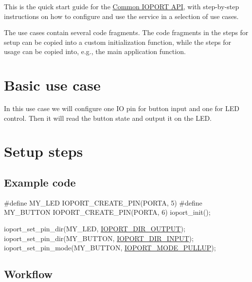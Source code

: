 This is the quick start guide for the \hyperlink{group__ioport__group}{Common I\-O\-P\-O\-R\-T A\-P\-I}, with step-\/by-\/step instructions on how to configure and use the service in a selection of use cases.

The use cases contain several code fragments. The code fragments in the steps for setup can be copied into a custom initialization function, while the steps for usage can be copied into, e.\-g., the main application function.\hypertarget{ioport_quickstart_ioport_quickstart_basic}{}\section{Basic use case}\label{ioport_quickstart_ioport_quickstart_basic}
In this use case we will configure one I\-O pin for button input and one for L\-E\-D control. Then it will read the button state and output it on the L\-E\-D.\hypertarget{ioport_quickstart_ioport_quickstart_basic_setup}{}\section{Setup steps}\label{ioport_quickstart_ioport_quickstart_basic_setup}
\hypertarget{ioport_quickstart_ioport_quickstart_basic_setup_code}{}\subsection{Example code}\label{ioport_quickstart_ioport_quickstart_basic_setup_code}

\begin{DoxyCode}
\textcolor{preprocessor}{         #define MY\_LED    IOPORT\_CREATE\_PIN(PORTA, 5)}
\textcolor{preprocessor}{}\textcolor{preprocessor}{         #define MY\_BUTTON IOPORT\_CREATE\_PIN(PORTA, 6)}
\textcolor{preprocessor}{}
         ioport\_init();

         ioport\_set\_pin\_dir(MY\_LED, \hyperlink{group__ioport__group_gga9c267f89800e58bd9dfd74e662a4a4c1a06de24313dad0169f3a366c62a84f4cc}{IOPORT\_DIR\_OUTPUT});
         ioport\_set\_pin\_dir(MY\_BUTTON, \hyperlink{group__ioport__group_gga9c267f89800e58bd9dfd74e662a4a4c1af854a0dce084e5a8e8744f9a502e7b7b}{IOPORT\_DIR\_INPUT});
         ioport\_set\_pin\_mode(MY\_BUTTON, \hyperlink{group__ioport__group_ga4c5d85e77f012b73dce89cfb84ef851f}{IOPORT\_MODE\_PULLUP});
\end{DoxyCode}
\hypertarget{ioport_quickstart_use_case_1_ioport_quickstart_basic_setup_flow}{}\subsection{Workflow}\label{ioport_quickstart_use_case_1_ioport_quickstart_basic_setup_flow}

